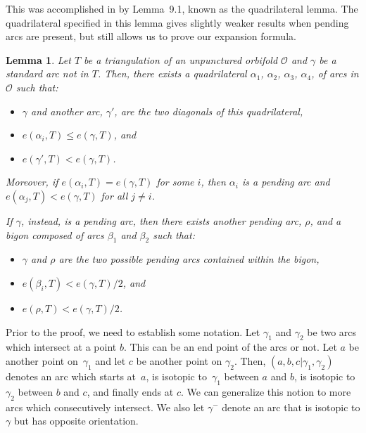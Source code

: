 \documentclass[11pt]{article}
\newcommand{\Orb}{\mathcal{O}}
\numberwithin{equation}{section}
\newtheorem{Lemma}[Theorem]{Lemma}
\begin{document}
This was accomplished in \cite{MSW} by Lemma~9.1, known as the quadrilateral lemma. The quadrilateral specified in this lemma gives slightly weaker results when pending arcs are present, but still allows us to prove our expansion formula.

\begin{Lemma}\label{lem:QuadAndBigon}
Let $T$ be a triangulation of an unpunctured orbifold $\mathcal{O}$ and $\gamma$ be a standard arc not in $T$. Then, there exists a quadrilateral $\alpha_1$, $\alpha_2$, $\alpha_3$, $\alpha_4$, of arcs in $\Orb$ such that:
\begin{itemize}\itemsep=0pt
\item $\gamma$ and another arc, $\gamma'$, are the two diagonals of this quadrilateral,
\item $e(\alpha_i, T) \leq e(\gamma, T)$, and
\item $e(\gamma', T) < e(\gamma, T)$.
\end{itemize}

Moreover, if $e(\alpha_i,T) = e(\gamma,T)$ for some $i$, then $\alpha_i$ is a pending arc and ${e(\alpha_j,T) < e(\gamma,T)}$ for all $j \neq i$.

If $\gamma$, instead, is a pending arc, then there exists another pending arc, $\rho$, and a bigon composed of arcs $\beta_1$ and $\beta_2$ such that:
\begin{itemize}\itemsep=0pt
\item $\gamma$ and $\rho$ are the two possible pending arcs contained within the bigon,
\item $e(\beta_i, T) < e(\gamma, T)/2$, and
\item $e(\rho, T) < e(\gamma, T)/2$.
\end{itemize}
\end{Lemma}

Prior to the proof, we need to establish some notation. Let $\gamma_1$ and $\gamma_2$ be two arcs which intersect at a point $b$. This can be an end point of the arcs or not. Let $a$ be another point on~$\gamma_1$ and let $c$ be another point on $\gamma_2$. Then, $(a,b, c\vert \gamma_1,\gamma_2)$ denotes an arc which starts at~$a$, is isotopic to~$\gamma_1$ between $a$ and $b$, is isotopic to $\gamma_2$ between $b$ and $c$, and finally ends at $c$. We can generalize this notion to more arcs which consecutively intersect. We also let $\gamma^-$ denote an arc that is isotopic to $\gamma$ but has opposite orientation.
\end{document}
